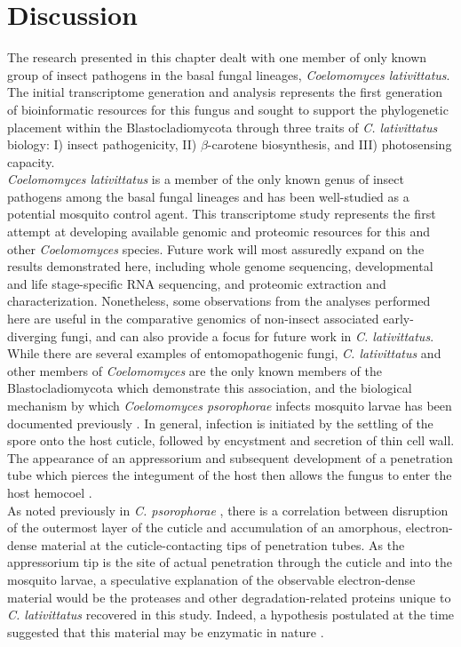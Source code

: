 \section{Discussion}
The research presented in this chapter dealt with one member of only known group of insect pathogens in the basal fungal lineages, \textit{Coelomomyces lativittatus}. The initial transcriptome generation and analysis represents the first generation of bioinformatic resources for this fungus and sought to support the phylogenetic placement within the Blastocladiomycota through three traits of \textit{C. lativittatus} biology: I) insect pathogenicity, II) $\beta$-carotene biosynthesis, and III) photosensing capacity.\\
\indent \textit{Coelomomyces lativittatus} is a member of the only known genus of insect pathogens among the basal fungal lineages and has been well-studied as a potential mosquito control agent. This transcriptome study represents the first attempt at developing available genomic and proteomic resources for this and other \textit{Coelomomyces} species. Future work will most assuredly expand on the results demonstrated here, including whole genome sequencing, developmental and life stage-specific RNA sequencing, and proteomic extraction and characterization. Nonetheless, some observations from the analyses performed here are useful in the comparative genomics of non-insect associated early-diverging fungi, and can also provide a focus for future work in \textit{C. lativittatus}. \\
\indent While there are several examples of entomopathogenic fungi, \textit{C. lativittatus} and other members of \textit{Coelomomyces} are the only known members of the Blastocladiomycota which demonstrate this association, and the biological mechanism by which \textit{Coelomomyces psorophorae} infects mosquito larvae has been documented previously \cite{Travland1979,Zebold1979}. In general, infection is initiated by the settling of the spore onto the host cuticle, followed by encystment and secretion of thin cell wall. The appearance of an appressorium and subsequent development of a penetration tube which pierces the integument of the host then allows the fungus to enter the host hemocoel \cite{Zebold1979}. \\
\indent As noted previously in \textit{C. psorophorae} \cite{Travland1979}, there is a correlation between disruption of the outermost layer of the cuticle and accumulation of an amorphous, electron-dense material at the cuticle-contacting tips of penetration tubes. As the appressorium tip is the site of actual penetration through the cuticle and into the mosquito larvae, a speculative explanation of the observable electron-dense material would be the proteases and other degradation-related proteins unique to \textit{C. lativittatus} recovered in this study. Indeed, a hypothesis postulated at the time suggested that this material may be enzymatic in nature \cite{Travland1979}. \\

